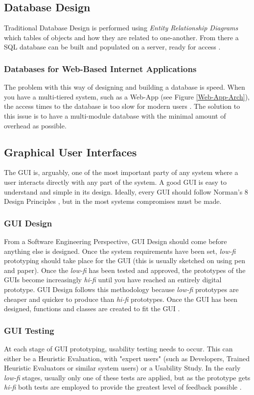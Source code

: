 \documentclass[review]{cmpreport}
\begin{document}
	\subsection{Database Design} \label{Database}
	Traditional Database Design is performed using \emph{Entity Relationship Diagrams} which tables of objects and how they are related to one-another. From there a SQL database can be built and populated on a server, ready for access \citep{DatabaseDesign}. 
	
	\subsubsection{Databases for Web-Based Internet Applications}
	The problem with this way of designing and building a database is speed. When you have a multi-tiered system, such as a Web-App (see Figure \ref{Web-App-Arch}), the access times to the database is too slow for modern users \citep{WebAppDatabase}. The solution to this issue is to have a multi-module database with the minimal amount of overhead as possible. 

	\subsection{Graphical User Interfaces} \label{GUIs}
	The GUI is, arguably, one of the most important party of any system where a user interacts directly with any part of the system. A good GUI is easy to understand and simple in its design. Ideally, every GUI should follow Norman's 8 Design Principles \citep{Norman}, but in the most systems compromises must be made. 
	
	\subsubsection{GUI Design}
	From a Software Engineering Perspective, GUI Design should come before anything else is designed. Once the system requirements have been set, \emph{low-fi} prototyping should take place for the GUI (this is usually sketched on using pen and paper). Once the \emph{low-fi} has been tested and approved, the prototypes of the GUIs become increasingly \emph{hi-fi} until you have reached an entirely digital prototype. GUI Design follows this methodology because \emph{low-fi} prototypes are cheaper and quicker to produce than \emph{hi-fi} prototypes. Once the GUI has been designed, functions and classes are created to fit the GUI \citep{GUIDesign}. 
	
	\subsubsection{GUI Testing}
	At each stage of GUI prototyping, usability testing needs to occur. This can either be a Heuristic Evaluation, with "expert users" (such as Developers, Trained Heuristic Evaluators or similar system users) or a Usability Study. In the early \emph{low-fi} stages, usually only one of these tests are applied, but as the prototype gets \emph{hi-fi} both tests are employed to provide the greatest level of feedback possible \citep{GUIDesign}.
	
\end{document}
